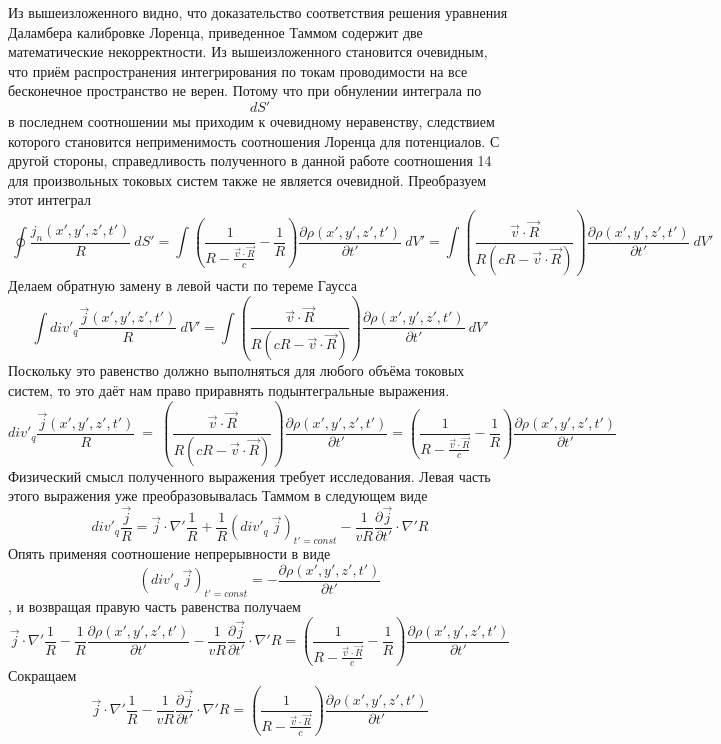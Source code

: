 \documentclass[11pt]{article}
\begin{document}
Из вышеизложенного видно, что доказательство соответствия решения
уравнения Даламбера калибровке Лоренца, приведенное Таммом содержит две
математические некорректности. Из вышеизложенного становится очевидным,
что приём распространения интегрирования по токам проводимости на все
бесконечное пространство не верен. Потому что при обнулении интеграла по
\[dS'\] в последнем соотношении мы приходим к очевидному неравенству,
следствием которого становится неприменимость соотношения Лоренца для
потенциалов. С другой стороны, справедливость полученного в данной
работе соотношения 14 для произвольных токовых систем также не является
очевидной. Преобразуем этот интеграл
\[\ \oint{\frac{{{j}_{n}}\left( x',y',z',t' \right)}{R}}\ dS'=\int{\left( \frac{1}{R-\frac{\overrightarrow{v}\cdot \overrightarrow{R}}{c}}-\frac{1}{R} \right)\frac{\partial \rho \left( x',y',z',t' \right)}{\partial t'}}\ dV'=\int{\left( \frac{\overrightarrow{v}\cdot \overrightarrow{R}}{R\left( cR-\overrightarrow{v}\cdot \overrightarrow{R} \right)} \right)\frac{\partial \rho \left( x',y',z',t' \right)}{\partial t'}}\ dV'\]
Делаем обратную замену в левой части по тереме Гаусса
\[\int{div{{'}_{q}}\frac{\overrightarrow{j}\left( x',y',z',t' \right)}{R}}\ dV'=\int{\left( \frac{\overrightarrow{v}\cdot \overrightarrow{R}}{R\left( cR-\overrightarrow{v}\cdot \overrightarrow{R} \right)} \right)\frac{\partial \rho \left( x',y',z',t' \right)}{\partial t'}}\ dV'\]
Поскольку это равенство должно выполняться для любого объёма токовых
систем, то это даёт нам право приравнять подынтегральные выражения.
\[div{{'}_{q}}\frac{\overrightarrow{j}\left( x',y',z',t' \right)}{R}\ =\ \left( \frac{\overrightarrow{v}\cdot \overrightarrow{R}}{R\left( cR-\overrightarrow{v}\cdot \overrightarrow{R} \right)} \right)\frac{\partial \rho \left( x',y',z',t' \right)}{\partial t'}=\left( \frac{1}{R-\frac{\overrightarrow{v}\cdot \overrightarrow{R}}{c}}-\frac{1}{R} \right)\frac{\partial \rho \left( x',y',z',t' \right)}{\partial t'}\]
Физический смысл полученного выражения требует исследования. Левая часть
этого выражения уже преобразовывалась Таммом в следующем виде
\[div{{'}_{q}}\frac{\overrightarrow{j}}{R}=\overrightarrow{j}\cdot \nabla '\frac{1}{R}+\frac{1}{R}{{\left( div{{'}_{q}}\ \overrightarrow{j} \right)}_{t'=const}}-\frac{1}{vR}\frac{\partial \overrightarrow{j}}{\partial t'}\cdot \nabla 'R\]
Опять применяя соотношение непрерывности в виде
\[{{\left( div{{'}_{q}}\ \overrightarrow{j} \right)}_{t'=const}}=-\frac{\partial \rho \left( x',y',z',t' \right)}{\partial t'}\],
и возвращая правую часть равенства получаем
\[\overrightarrow{j}\cdot \nabla '\frac{1}{R}-\frac{1}{R}\frac{\partial \rho \left( x',y',z',t' \right)}{\partial t'}-\frac{1}{vR}\frac{\partial \overrightarrow{j}}{\partial t'}\cdot \nabla 'R=\left( \frac{1}{R-\frac{\overrightarrow{v}\cdot \overrightarrow{R}}{c}}-\frac{1}{R} \right)\frac{\partial \rho \left( x',y',z',t' \right)}{\partial t'}\]
Сокращаем
\[\overrightarrow{j}\cdot \nabla '\frac{1}{R}-\frac{1}{vR}\frac{\partial \overrightarrow{j}}{\partial t'}\cdot \nabla 'R=\left( \frac{1}{R-\frac{\overrightarrow{v}\cdot \overrightarrow{R}}{c}} \right)\frac{\partial \rho \left( x',y',z',t' \right)}{\partial t'}\]
\end{document}
